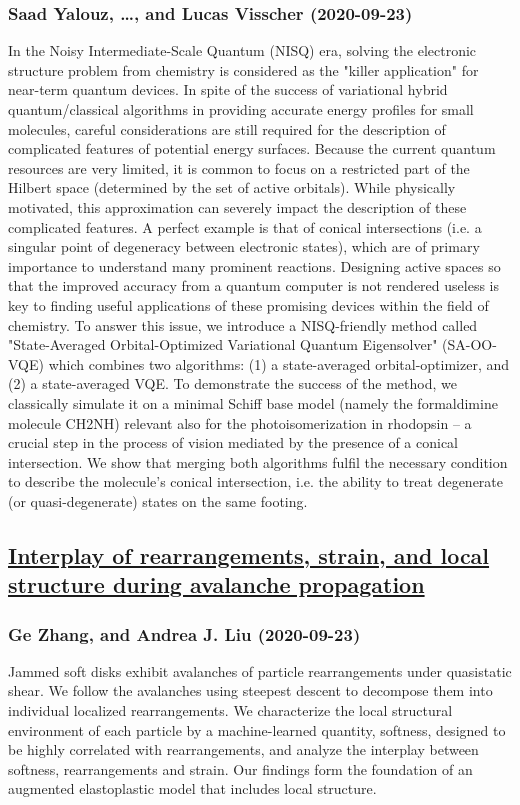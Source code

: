 \subsubsection*{Saad Yalouz, \dots, and Lucas Visscher (2020-09-23)}
In the Noisy Intermediate-Scale Quantum (NISQ) era, solving the electronic
structure problem from chemistry is considered as the "killer application" for
near-term quantum devices. In spite of the success of variational hybrid
quantum/classical algorithms in providing accurate energy profiles for small
molecules, careful considerations are still required for the description of
complicated features of potential energy surfaces. Because the current quantum
resources are very limited, it is common to focus on a restricted part of the
Hilbert space (determined by the set of active orbitals). While physically
motivated, this approximation can severely impact the description of these
complicated features. A perfect example is that of conical intersections (i.e.
a singular point of degeneracy between electronic states), which are of primary
importance to understand many prominent reactions. Designing active spaces so
that the improved accuracy from a quantum computer is not rendered useless is
key to finding useful applications of these promising devices within the field
of chemistry. To answer this issue, we introduce a NISQ-friendly method called
"State-Averaged Orbital-Optimized Variational Quantum Eigensolver" (SA-OO-VQE)
which combines two algorithms: (1) a state-averaged orbital-optimizer, and (2)
a state-averaged VQE. To demonstrate the success of the method, we classically
simulate it on a minimal Schiff base model (namely the formaldimine molecule
CH2NH) relevant also for the photoisomerization in rhodopsin -- a crucial step
in the process of vision mediated by the presence of a conical intersection. We
show that merging both algorithms fulfil the necessary condition to describe
the molecule's conical intersection, i.e. the ability to treat degenerate (or
quasi-degenerate) states on the same footing.

\subsection*{\href{http://arxiv.org/abs/2009.11414v1}{Interplay of rearrangements, strain, and local structure during  avalanche propagation}}
\subsubsection*{Ge Zhang, and Andrea J. Liu (2020-09-23)}
Jammed soft disks exhibit avalanches of particle rearrangements under
quasistatic shear. We follow the avalanches using steepest descent to decompose
them into individual localized rearrangements. We characterize the local
structural environment of each particle by a machine-learned quantity,
softness, designed to be highly correlated with rearrangements, and analyze the
interplay between softness, rearrangements and strain. Our findings form the
foundation of an augmented elastoplastic model that includes local structure.

